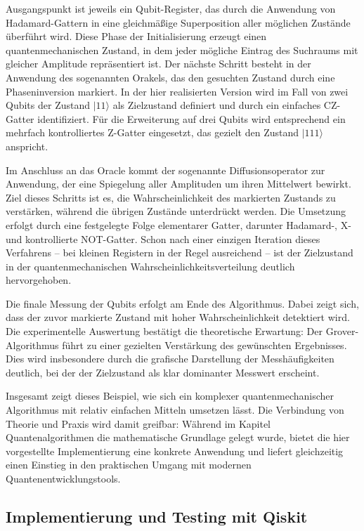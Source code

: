 Ausgangspunkt ist jeweils ein Qubit-Register, das durch die Anwendung von Hadamard-Gattern in eine gleichmäßige Superposition aller möglichen Zustände überführt wird. Diese Phase der Initialisierung erzeugt einen quantenmechanischen Zustand, in dem jeder mögliche Eintrag des Suchraums mit gleicher Amplitude repräsentiert ist. Der nächste Schritt besteht in der Anwendung des sogenannten Orakels, das den gesuchten Zustand durch eine Phaseninversion markiert. In der hier realisierten Version wird im Fall von zwei Qubits der Zustand $|11\rangle$ als Zielzustand definiert und durch ein einfaches CZ-Gatter identifiziert. Für die Erweiterung auf drei Qubits wird entsprechend ein mehrfach kontrolliertes Z-Gatter eingesetzt, das gezielt den Zustand $|111\rangle$ anspricht.

Im Anschluss an das Oracle kommt der sogenannte Diffusionsoperator zur Anwendung, der eine Spiegelung aller Amplituden um ihren Mittelwert bewirkt. Ziel dieses Schritts ist es, die Wahrscheinlichkeit des markierten Zustands zu verstärken, während die übrigen Zustände unterdrückt werden. Die Umsetzung erfolgt durch eine festgelegte Folge elementarer Gatter, darunter Hadamard-, X- und kontrollierte NOT-Gatter. Schon nach einer einzigen Iteration dieses Verfahrens – bei kleinen Registern in der Regel ausreichend – ist der Zielzustand in der quantenmechanischen Wahrscheinlichkeitsverteilung deutlich hervorgehoben.

Die finale Messung der Qubits erfolgt am Ende des Algorithmus. Dabei zeigt sich, dass der zuvor markierte Zustand mit hoher Wahrscheinlichkeit detektiert wird. Die experimentelle Auswertung bestätigt die theoretische Erwartung: Der Grover-Algorithmus führt zu einer gezielten Verstärkung des gewünschten Ergebnisses. Dies wird insbesondere durch die grafische Darstellung der Messhäufigkeiten deutlich, bei der der Zielzustand als klar dominanter Messwert erscheint.

Insgesamt zeigt dieses Beispiel, wie sich ein komplexer quantenmechanischer Algorithmus mit relativ einfachen Mitteln umsetzen lässt. Die Verbindung von Theorie und Praxis wird damit greifbar: Während im Kapitel Quantenalgorithmen die mathematische Grundlage gelegt wurde, bietet die hier vorgestellte Implementierung eine konkrete Anwendung und liefert gleichzeitig einen Einstieg in den praktischen Umgang mit modernen Quantenentwicklungstools.

\subsection{Implementierung und Testing mit Qiskit}

